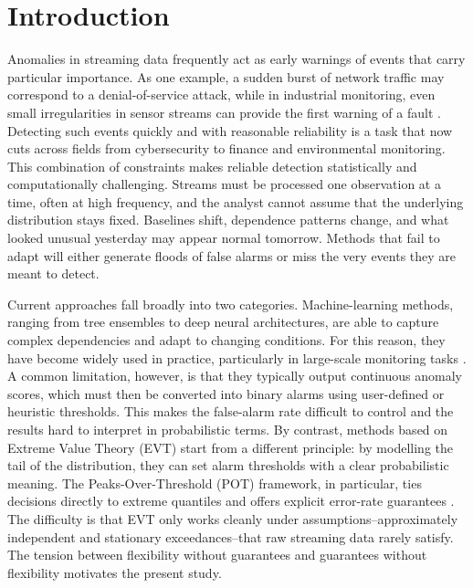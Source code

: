 \documentclass{statsmsc}
\begin{document}
\section{Introduction}

Anomalies in streaming data frequently act as early warnings of events that carry particular importance. As one example, a 
sudden burst of network traffic may correspond to a denial-of-service attack, while in industrial monitoring, even small 
irregularities in sensor streams can provide the first warning of a fault \citep{chandola2009anomaly}. Detecting such events
quickly and with reasonable reliability is a task that now cuts across fields from cybersecurity to finance and environmental
monitoring. This combination of constraints makes reliable detection statistically and computationally challenging. Streams
must be processed one observation at a time, often at high frequency, and the analyst cannot assume that the underlying 
distribution stays fixed. Baselines shift, dependence patterns change, and what looked unusual yesterday may appear normal
tomorrow. Methods that fail to adapt will either generate floods of false alarms or miss the very events they are meant 
to detect.

Current approaches fall broadly into two categories. Machine-learning methods, ranging from tree ensembles to deep neural
architectures, are able to capture complex dependencies and adapt to changing conditions. For this reason, they have become
widely used in practice, particularly in large-scale monitoring tasks \citep{chandola2009anomaly, campos2016evaluation}. 
A common limitation, however, is that they typically output continuous anomaly scores, which must then be converted into 
binary alarms using user-defined or heuristic thresholds. This makes the false-alarm rate difficult to control and the 
results hard to interpret in probabilistic terms. By contrast, methods based on Extreme Value Theory (EVT) start from a 
different principle: by modelling the tail of the distribution, they can set alarm thresholds with a clear probabilistic 
meaning. The Peaks-Over-Threshold (POT) framework, in particular, ties decisions directly to extreme quantiles and offers 
explicit error-rate guarantees \citep{Coles2001}. The difficulty is that EVT only works cleanly under assumptions--approximately
independent and stationary exceedances--that raw streaming data rarely satisfy. The tension between flexibility without 
guarantees and guarantees without flexibility motivates the present study.
\end{document}

